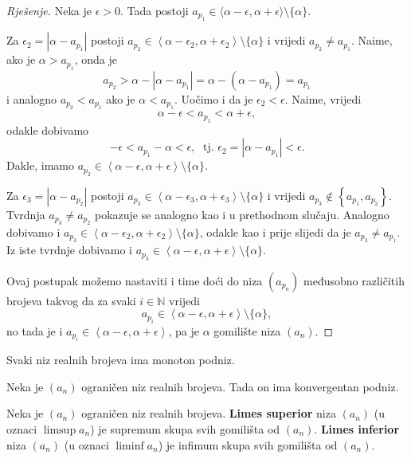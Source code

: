 \begin{proof}[Rješenje]
Neka je \(\epsilon>0\). Tada postoji \(a_{p_1}\in \langle \alpha-\epsilon, \alpha+\epsilon\rangle\setminus \{\alpha\}\). 

Za \(\epsilon_2=\left\lvert \alpha-a_{p_1}\right\rvert\) postoji \(a_{p_2}\in \left\langle \alpha-\epsilon_2, \alpha+\epsilon_2\right\rangle\setminus \{\alpha\}\) i vrijedi \(a_{p_2}\neq a_{p_1}\). Naime, ako je \(\alpha>a_{p_1}\), onda je \[a_{p_2}>\alpha-\left\lvert \alpha-a_{p_1}\right\rvert=\alpha-(\alpha-a_{p_1})=a_{p_1}\]
i analogno \(a_{p_2}<a_{p_1}\) ako je \(\alpha< a_{p_1}\).
Uočimo i da je \(\epsilon_2<\epsilon\). Naime, vrijedi
\[\alpha-\epsilon<a_{p_1}<\alpha+\epsilon,\]
odakle dobivamo
\[-\epsilon<a_{p_1}-\alpha<\epsilon,\;\text{ tj. } \epsilon_2=|\alpha-a_{p_1}|<\epsilon.\]
Dakle, imamo \(a_{p_2}\in \left\langle \alpha-\epsilon, \alpha+\epsilon\right\rangle\setminus \{\alpha\}\).

Za \(\epsilon_3=\left\lvert \alpha-a_{p_2}\right\rvert\) postoji \(a_{p_3}\in \left\langle \alpha-\epsilon_3, \alpha+\epsilon_3\right\rangle\setminus \{\alpha\}\) i vrijedi \(a_{p_3}\notin \left\{a_{p_1},a_{p_2}\right\}\). Tvrdnja \(a_{p_3}\neq a_{p_2}\) pokazuje se analogno kao i u prethodnom slučaju. Analogno dobivamo i \(a_{p_3}\in \left\langle \alpha-\epsilon_2, \alpha+\epsilon_2\right\rangle\setminus \{\alpha\}\), odakle kao i prije slijedi da je \(a_{p_3}\neq a_{p_1}\). Iz iste tvrdnje dobivamo i \(a_{p_3}\in \left\langle \alpha-\epsilon, \alpha+\epsilon\right\rangle\setminus \{\alpha\}\).

Ovaj postupak možemo nastaviti i time doći do niza \((a_{p_n})\) međusobno različitih brojeva takvog da za svaki \(i\in \mathbb{N}\) vrijedi 
\[a_{p_i}\in\left\langle \alpha-\epsilon, \alpha+\epsilon\right\rangle\setminus\{\alpha\},\]
no tada je i \(a_{p_i}\in\left\langle \alpha-\epsilon, \alpha+\epsilon\right\rangle\), pa je \(\alpha\) gomilište niza \((a_n)\).
\end{proof}  
\begin{remark}
\label{bwlemma}
Svaki niz realnih brojeva ima monoton podniz.
\end{remark}
\begin{remark}
Neka je \((a_n)\) ograničen niz realnih brojeva. Tada on ima konvergentan podniz.
\end{remark}
\begin{definition}
Neka je \((a_n)\) ograničen niz realnih brojeva. \textbf{Limes superior} niza \((a_n)\) (u oznaci \(\limsup{a_n}\)) je supremum skupa svih gomilišta od \((a_n)\). \textbf{Limes inferior} niza \((a_n)\) (u oznaci \(\liminf{a_n}\)) je infimum skupa svih gomilišta od \((a_n)\). 
\end{definition}

